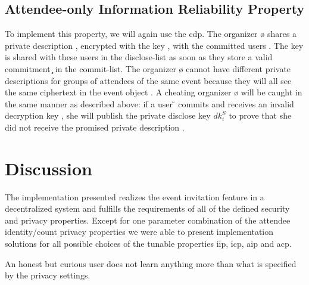 

\subsection{Attendee-only Information Reliability Property}
	\label{subsection:event-invitations-dosns:air-property}
To implement this property, we will again use the \acl{cdp}. The 
organizer \o{} shares a private description \dS{}, encrypted with the key \PDK{}, 
with the committed users \C{}. The key is shared with these users in the
disclose-list as soon as they store a valid commitment \c{} in the
commit-list.
%
The organizer \o{} cannot have different private descriptions for groups of attendees 
of the same event \e{} because they will all see the same ciphertext in the event 
object \eo{}.
%
A cheating organizer \o{} will be caught in the same manner as described 
above: if a user \u{} commits and receives an invalid decryption key \PDK{}, she 
will publish the private disclose key $dk_i^S$ to prove that she did not receive 
the promised private description \dS{}.


\section{Discussion}
	\label{section:event-invitations-dosns:discussion}

The implementation presented realizes the event invitation feature
in a decentralized system and fulfills the requirements of all of the
defined security and privacy properties. Except for one parameter
combination of the attendee identity/count privacy properties we were
able to present implementation solutions for all possible choices of the
tunable properties \Ac{iip}, \Ac{icp}, \Ac{aip} and \Ac{acp}.

An honest but curious user does not learn anything more than what is
specified by the privacy settings. 

